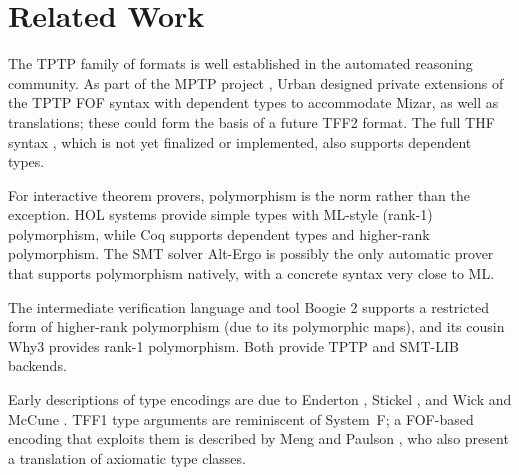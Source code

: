 \section{Related Work}
\label{sec_related}

The TPTP family of formats is well established in the automated reasoning
community. As part of the MPTP project \cite{urban-2006}, Urban designed private
extensions of the TPTP FOF syntax with dependent types to
accommodate Mizar, as well as translations;
these could form the basis of a future TFF2 format. The full THF syntax \cite{sutcliffe-benzmueller-2010},
which is not yet finalized or implemented,
also supports dependent types.


For interactive theorem provers, polymorphism is the norm rather
than the exception. HOL systems
\cite{gordon-melham-1993,harrison-1996,nipkow-et-al-2002} provide simple types
with %
ML-style (rank-1) polymorphism, while Coq
\cite{bertot-casteran-2004} supports dependent types and higher-rank
polymorphism.
The SMT solver Alt-Ergo \cite{bobot-et-al-2008} is possibly the only automatic
prover that supports polymorphism natively, with a concrete syntax very close to
ML.

The intermediate verification language and tool Boogie 2 \cite{leino-ruemmer-2010}
supports a restricted form of higher-rank polymorphism (due to its polymorphic maps),
and its cousin Why3 \cite{bobot-et-al-2011}
provides rank-1 polymorphism. Both provide TPTP and SMT-LIB backends.

Early descriptions of type encodings are due to Enderton
\cite[\S4.3]{enderton-1972}, Stickel \cite[p.~99]{stickel-1986}, and Wick and
McCune \cite[\S4]{wick-mccune-1989}. TFF1 type arguments are reminiscent of
System~F; a FOF-based encoding that exploits them is described by Meng and
Paulson \cite{meng-paulson-2008-trans}, who also present a translation of
axiomatic type classes.


